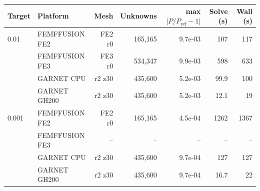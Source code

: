 \begin{tabular}{llrrrrr}
\hline
Target & Platform & Mesh & Unknowns & max $|P/P_\mathrm{ref}-1|$ & Solve (s) & Wall (s) \\
\hline
0.01 & FEMFFUSION FE2 & FE2 r0 & 165,165 & 9.7e-03 & 107 & 117 \\
 & FEMFFUSION FE3 & FE3 r0 & 534,347 & 9.9e-03 & 598 & 633 \\
 & GARNET CPU & r2 z30 & 435,600 & 5.2e-03 & 99.9 & 100 \\
 & GARNET GH200 & r2 z30 & 435,600 & 5.2e-03 & 12.1 & 19 \\
\hline
0.001 & FEMFFUSION FE2 & FE2 r0 & 165,165 & 4.5e-04 & 1262 & 1367 \\
 & FEMFFUSION FE3 & -- & -- & -- & -- & -- \\
 & GARNET CPU & r2 z30 & 435,600 & 9.7e-04 & 127 & 127 \\
 & GARNET GH200 & r2 z30 & 435,600 & 9.7e-04 & 16.7 & 22 \\
\hline
\end{tabular}
